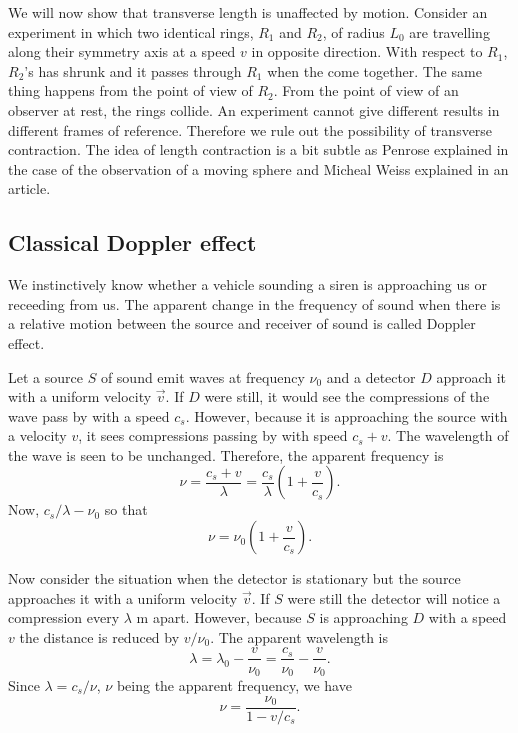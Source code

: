We will now show that transverse length is unaffected by motion. Consider an 
experiment in which two 
identical rings, $R_1$ and $R_2$, of radius $L_0$ are travelling along their 
symmetry axis at a speed $v$ in opposite direction. With respect to $R_1$, 
$R_2$'s has shrunk and it passes through $R_1$ when the come together. The 
same thing happens from the point of view of $R_2$. From the point of view of 
an observer at rest, the rings collide. An experiment cannot give different 
results in different frames of reference. Therefore we rule out the possibility 
of transverse contraction. The idea of length contraction is a bit subtle as
Penrose \cite{penrose1959apparent} explained in the case of the observation of
a moving sphere and Micheal Weiss \cite{weiss1995} explained in an article.

\subsection{Classical Doppler effect}
We instinctively know whether a vehicle sounding a siren is approaching us or
receeding from us. The apparent change in the frequency of sound when there is
a relative motion between the source and receiver of sound is called Doppler
effect. 

Let a source $S$ of sound emit waves at frequency $\nu_0$ and a detector $D$
approach it with a uniform velocity $\vec{v}$. If $D$ were still, it would
see the compressions of the wave pass by with a speed $c_s$. However, because
it is approaching the source with a velocity $v$, it sees compressions passing
by with speed $c_s + v$. The wavelength of the wave is seen to be unchanged.
Therefore, the apparent frequency is
\[
\nu = \frac{c_s + v}{\lambda} = \frac{c_s}{\lambda}
\left(1 + \frac{v}{c_s}\right).
\]
Now, $c_s/\lambda - \nu_0$ so that
\begin{equation}\label{c1s2e10}
\nu = \nu_0\left(1 + \frac{v}{c_s}\right).
\end{equation}

Now consider the situation when the detector is stationary but the source
approaches it with a uniform velocity $\vec{v}$. If $S$ were still the detector
will notice a compression every $\lambda$ m apart. However, because $S$ is
approaching $D$ with a speed $v$ the distance is reduced by $v/\nu_0$. The 
apparent wavelength is
\[
\lambda = \lambda_0 - \frac{v}{\nu_0} = \frac{c_s}{\nu_0} - \frac{v}{\nu_0}.
\]
Since $\lambda = c_s/\nu$, $\nu$ being the apparent frequency, we have
\begin{equation}\label{c1s2e11}
\nu = \frac{\nu_0}{1 - v/c_s}.
\end{equation}

